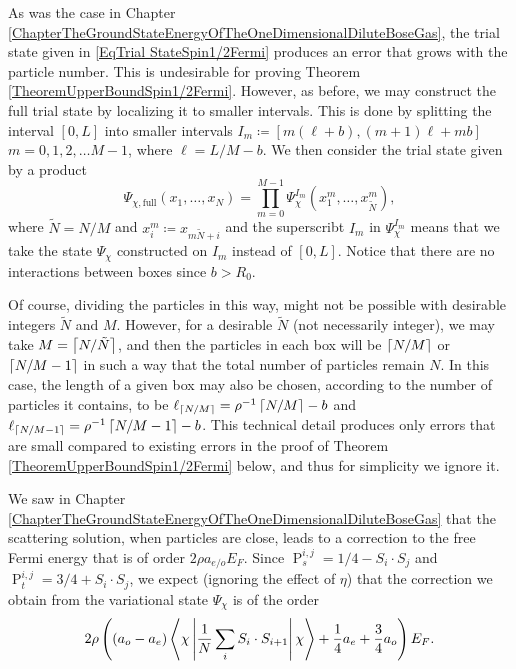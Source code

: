 As was the case in Chapter \ref{ChapterTheGroundStateEnergyOfTheOneDimensionalDiluteBoseGas}, the trial state given in \eqref{EqTrial StateSpin1/2Fermi} produces an error that grows with the particle number. This is undesirable for proving Theorem \ref{TheoremUpperBoundSpin1/2Fermi}. However, as before, we may construct the full trial state by localizing it to smaller intervals. This is done by splitting the interval $ [0,L] $ into smaller intervals $ I_m\coloneqq[m(\ell+b),(m+1)\ell+mb] $ $ m=0,1,2,\ldots M-1 $, where $ \ell=L/M-b $. We then consider the trial state given by a product \begin{equation}\label{EqFullTrialStateSpin1/2}
\Psi_{\chi,\text{full}}(x_1,\ldots,x_N)=\prod_{m=0}^{M-1}\Psi^{I_m}_{\chi}(x_1^m,\ldots,x_{\tilde{N}}^m),
\end{equation}
where $ \tilde{N}=N/M $ and $ x_i^m\coloneqq x_{m\tilde{N}+i} $ and the superscribt $ I_m $ in $ \Psi^{I_m}_{\chi} $ means that we take the state $ \Psi_{\chi} $ constructed on $ I_m $ instead of $ [0,L] $. Notice that there are no interactions between boxes since $ b>R_0 $. 
\begin{remark}\label{RemarkTechnicalDetailTheoremUpperBoundProof}
	Of course, dividing the particles in this way, might not be possible with desirable integers $\tilde{N}$ and $ M $. However, for a desirable $\tilde{N}$ (not necessarily integer), we may take $M=\left\lceil  N/\tilde{N} \right\rceil$, and then the particles in each box will be $\left\lceil N/M \right\rceil$ or $\left\lceil N/M-1 \right\rceil$ in such a way that the total number of particles remain $N$. In this case, the length of a given box may also be chosen, according to the number of particles it contains, to be $\ell_{\left\lceil N/M \right\rceil}=\rho^{-1}\left\lceil N/M \right\rceil-b$ and $ \ell_{\left\lceil N/M-1 \right\rceil}=\rho^{-1}\left\lceil N/M-1 \right\rceil-b $. This technical detail produces only errors that are small compared to existing errors in the proof of Theorem \ref{TheoremUpperBoundSpin1/2Fermi} below, and thus for simplicity we ignore it.
\end{remark}
 We saw in Chapter \ref{ChapterTheGroundStateEnergyOfTheOneDimensionalDiluteBoseGas} that the scattering solution, when particles are close, leads to a correction to the free Fermi energy that is of order $ 2\rho a_{e/o} E_F $. Since $ \operatorname{P}_s^{i,j}=1/4-S_i\cdot S_j $ and $ \operatorname{P}_t^{i,j}=3/4+S_i\cdot S_j $, we expect (ignoring the effect of $ \eta $) that the correction we obtain from the variational state $ \Psi_\chi $ is of the order $$
2\rho\left( (a_o-a_e) \left\langle\chi \left\vert \frac{1}{N}\sum_{i}S_i\cdot S_{i+1} \right\vert \chi\right\rangle +\frac{1}{4}a_e+\frac{3}{4}a_o \right)E_F.
$$ 
